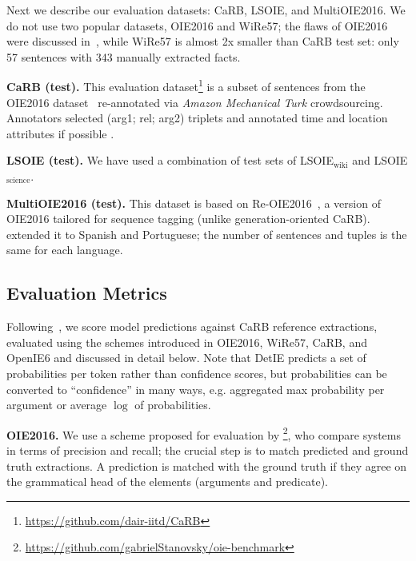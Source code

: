 \documentclass[letterpaper]{article} \usepackage{aaai22}  \usepackage{times}  \usepackage{helvet}  \usepackage{courier}  \usepackage[hyphens]{url}  \usepackage{graphicx} \usepackage{placeins}
\begin{document}
Next we describe our evaluation datasets: CaRB, LSOIE, and MultiOIE2016. We do not use two popular datasets, OIE2016 and WiRe57; the flaws of OIE2016 were discussed in~\cite{zhan2020span,bhardwaj-etal-2019-carb}, while WiRe57 is almost 2x smaller than CaRB test set: only 57 sentences with 343 manually extracted facts.


\textbf{CaRB (test).} This evaluation dataset\footnote{\url{https://github.com/dair-iitd/CaRB}} is a subset of sentences from the OIE2016 dataset~\cite{Stanovsky2016EMNLP} re-annotated via \emph{Amazon Mechanical Turk} crowdsourcing.  Annotators selected (arg1; rel; arg2) triplets and annotated time and location attributes if possible
\cite{bhardwaj-etal-2019-carb}.

\textbf{LSOIE (test).} We have used a combination of test sets of LSOIE$_{\mathrm{wiki}}$ and LSOIE$_{\mathrm{science}}$.

\textbf{MultiOIE2016 (test).} This dataset is based on Re-OIE2016~\cite{zhan2020span}, a version of OIE2016 tailored for sequence tagging (unlike generation-oriented CaRB). \citet{ro2020multi} extended it to Spanish and Portuguese;
the number of sentences and tuples is the same for each language.

\subsection{Evaluation Metrics}\label{ssec:eval_data}

Following~\citet{kolluru2020openie6}, we score model predictions 
against CaRB reference extractions,
evaluated using the schemes introduced in OIE2016, WiRe57, CaRB, and OpenIE6 and discussed in detail below.
Note that DetIE predicts a set of probabilities per token rather than confidence scores, but probabilities can be converted to ``confidence'' in many ways, e.g. aggregated max probability per argument or average $\log$ of probabilities.

\textbf{OIE2016.}
We use a scheme proposed for evaluation by \citet{Stanovsky2016EMNLP}\footnote{\url{https://github.com/gabrielStanovsky/oie-benchmark}}, who compare systems in terms of precision and recall; the crucial step is to match predicted and ground truth extractions. A prediction is matched with the ground truth if they agree on the grammatical head of the elements (arguments and predicate).  
\end{document}
